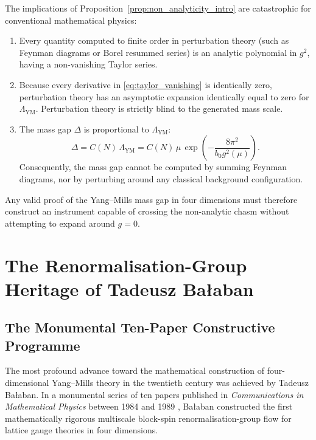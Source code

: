 The implications of Proposition~\ref{prop:non_analyticity_intro} are catastrophic for conventional mathematical physics:
\begin{enumerate}
    \item Every quantity computed to finite order in perturbation theory (such as Feynman diagrams or Borel resummed series) is an analytic polynomial in $g^2$, having a non-vanishing Taylor series.
    \item Because every derivative in \eqref{eq:taylor_vanishing} is identically zero, perturbation theory has an asymptotic expansion identically equal to zero for $\Lambda_{\mathrm{YM}}$. Perturbation theory is strictly blind to the generated mass scale.
    \item The mass gap $\Delta$ is proportional to $\Lambda_{\mathrm{YM}}$:
    \begin{equation}
    \Delta = C(N) \, \Lambda_{\mathrm{YM}} = C(N) \, \mu \, \exp\left( -\frac{8\pi^2}{b_0 g^2(\mu)} \right).
    \end{equation}
    Consequently, the mass gap cannot be computed by summing Feynman diagrams, nor by perturbing around any classical background configuration.
\end{enumerate}

Any valid proof of the Yang--Mills mass gap in four dimensions must therefore construct an instrument capable of crossing the non-analytic chasm without attempting to expand around $g = 0$.


\section{The Renormalisation-Group Heritage of Tadeusz Ba\l aban}
\label{sec:balaban_heritage}

\subsection{The Monumental Ten-Paper Constructive Programme}
\label{subsec:balaban_ten_papers}
The most profound advance toward the mathematical construction of four-dimensional Yang--Mills theory in the twentieth century was achieved by Tadeusz Ba\l aban. In a monumental series of ten papers published in \emph{Communications in Mathematical Physics} between 1984 and 1989 \cite{Balaban1984, Balaban1984a, Balaban1984b, Balaban1985, Balaban1985a, Balaban1985b, Balaban1985c, Balaban1987, Balaban1988, Balaban1989}, Ba\l aban constructed the first mathematically rigorous multiscale block-spin renormalisation-group flow for lattice gauge theories in four dimensions.

